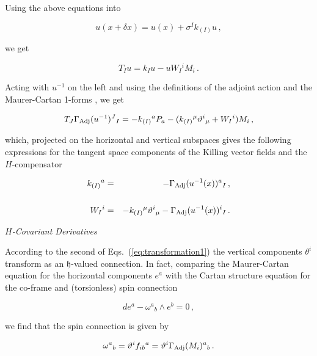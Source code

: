 \documentclass[12pt,a4paper]{article}
\begin{document}
\noindent 
Using the above equations into

\begin{equation}
u(x+\delta x)= u(x) + \sigma^{I} k_{(I)}u\, ,
\end{equation}

\noindent 
we get 

\begin{equation}
\label{eq:esa}
T_{I}u = k_{I}u -uW_{I}{}^{i}M_{i}\, .
\end{equation}

\noindent 
Acting with $u^{-1}$ on the left and using the definitions of the
adjoint action and the Maurer-Cartan 1-forms , we get

\begin{equation}
T_{J}\Gamma_{\rm Adj}(u^{-1})^{J}{}_{I} = -k_{(I)}{}^{a}P_{a} 
-(k_{(I)}{}^{\mu}\vartheta^{i}{}_{\mu} +W_{I}{}^{i})M_{i}\, ,   
\end{equation}

\noindent
which, projected on the horizontal and vertical subspaces gives the
following expressions for the tangent space components of the Killing
vector fields and the $H$-compensator

\begin{eqnarray}
\label{eq:KV}
k_{(I)}{}^{a} & = & -\Gamma_{\rm Adj}(u^{-1}(x))^{a}{}_{I}\, ,\\
& & \nonumber \\
\label{eq:Hcompensator}
W_{I}{}^{i} & = & -k_{(I)}{}^{\mu}\vartheta^{i}{}_{\mu} 
-\Gamma_{\rm Adj}(u^{-1}(x))^{i}{}_{I}\, .
\end{eqnarray}



\noindent
\textit{$H$-Covariant Derivatives}

According to the second of Eqs.~(\ref{eq:transformation1}) the
vertical components $\theta^{i}$ transform as an $\mathfrak{h}$-valued
connection. In fact, comparing the Maurer-Cartan equation for the
horizontal components $e^{a}$ with the Cartan structure equation for
the co-frame and (torsionless) spin connection

\begin{equation}
de^{a}-\omega^{a}{}_{b}\wedge e^{b}=0\, ,  
\end{equation}

\noindent 
we find that the spin connection is given by 

\begin{equation}
\label{eq:SC}
\omega^{a}{}_{b} 
=\vartheta^{i}f_{ib}{}^{a}=\vartheta^{i}\Gamma_{\rm Adj}(M_{i})^{a}{}_{b}\, .  
\end{equation}
\end{document}
